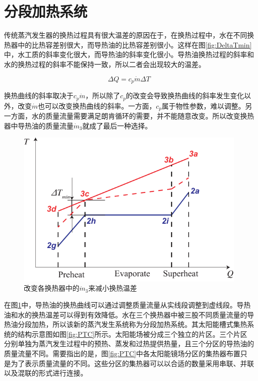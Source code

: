 \section{分段加热系统}
\label{sec:melrs}

传统蒸汽发生器的换热过程具有很大温差的原因在于，在换热过程中，水在不同换热器中的比热容差别很大，而导热油的比热容差别很小。这样在图\ref{fig:DeltaTmin}中，水工质的斜率变化很大，而导热油的斜率变化很小。导热油换热过程的斜率和水的换热过程的斜率不能保持一致，所以二者会出现较大的温差。

\begin{equation}
  \Delta Q =  c_p\dot{m} \Delta T
\end{equation}

换热曲线的斜率取决于$c_p\dot{m}$，所以除了$c_p$的改变会导致换热曲线的斜率发生变化以外，改变$\dot{m}$也可以改变换热曲线的斜率。一方面，$c_p$属于物性参数，难以调整。另一方面，水的质量流量需要满足朗肯循环的需要，并不能随意改变。所以改变换热器中导热油的质量流量$\dot{m}_3$就成了最后一种选择。

\noindent \begin{figure}[htbp]
\begin{center}
	\includegraphics[width = 0.5\columnwidth]{fig/BetterCurve}
	\caption{改变各换热器中的$\dot{m}_3$来减小换热温差}
	\label{fig:BetterCurve}
\end{center}
\end{figure}

在图\ref{fig:BetterCurve}中，导热油的换热曲线可以通过调整质量流量从实线段调整到虚线段。导热油和水的换热温差可以得到有效降低。水在三个换热器中被三股不同质量流量的导热油分段加热，所以该新的蒸汽发生系统称为分段加热系统。其太阳能槽式集热系统的结构示意图如图\ref{fig:PTC}所示。太阳能场被分成三个独立的片区。三个片区分别单独为蒸汽发生过程中的预热、蒸发和过热提供热量，且三个分区的导热油的质量流量不同。需要指出的是，图\ref{fig:PTC}中各太阳能镜场分区的集热器布置只是为了表示质量流量的不同。这些分区的集热器可以以合适的数量采用串联、并联以及混联的形式进行连接。

